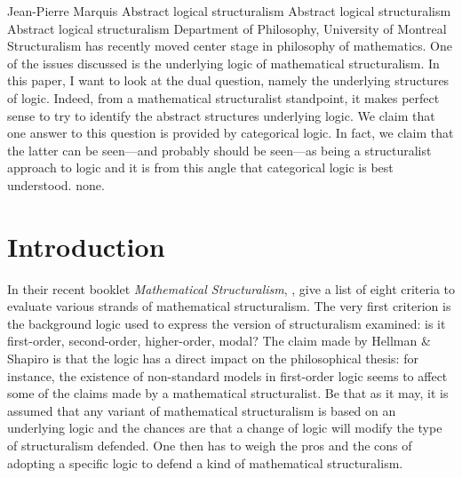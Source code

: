\begin{artengenv}{Jean-Pierre Marquis}
	{Abstract logical structuralism}
	{Abstract logical structuralism}
	{Abstract logical structuralism}
	{Department of Philosophy, University of Montreal}
	{Structuralism has recently moved center stage in philosophy of mathematics. One of the issues discussed is the underlying logic of mathematical structuralism. In this paper, I want to look at the dual question, namely the underlying structures of logic. Indeed, from a mathematical structuralist standpoint, it makes perfect sense to try to identify the abstract structures underlying logic. We claim that one answer to this question is provided by categorical logic. In fact, we claim that the latter can be seen---and probably should be seen---as being a structuralist approach to logic and it is from this angle that categorical logic is best understood.}
	{none.}





\section{Introduction}
\lettrine[loversize=0.13,lines=2,lraise=-0.03,nindent=0em,findent=0.2pt]%
{I}{}n their recent booklet \emph{Mathematical Structuralism}, \citeauthor{HellmanShap2019} \parencite*{HellmanShap2019}, %
give a list of eight criteria to evaluate various strands of mathematical structuralism. The very first criterion is the background logic used to express the version of structuralism examined: is it first-order, second-order, higher-order, modal? The claim made by Hellman \& Shapiro is that the logic has a direct impact on the philosophical thesis: for instance, the existence of non-standard models in first-order logic seems to affect some of the claims made by a mathematical structuralist. Be that as it may, it is assumed that any variant of mathematical structuralism is based on an underlying logic and the chances are that a change of logic will modify the type of structuralism defended. One then has to weigh the pros and the cons of adopting a specific logic to defend a kind of mathematical structuralism. 


\end{artengenv}
